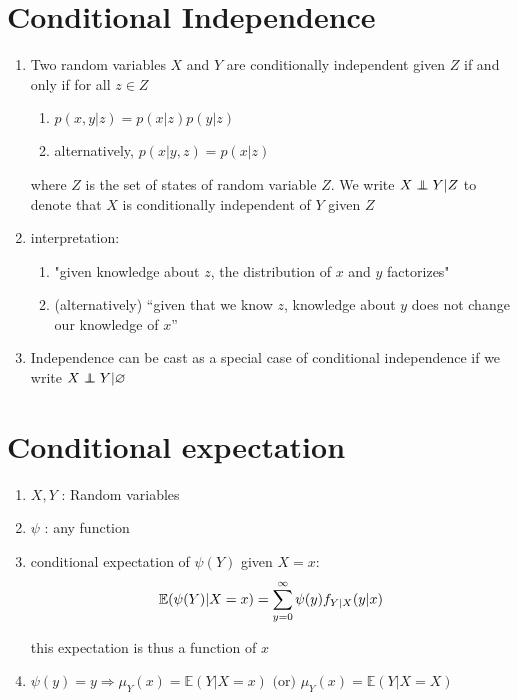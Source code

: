 \section{Conditional Independence \cite{mfml-1}} \label{Multivariate Distributions: Conditional Independence}

\begin{enumerate}
    \item Two random variables $X$ and $Y$ are conditionally independent given $Z$ if and only if for all $z \in Z$
    \begin{enumerate}
        \item $p(x, y | z) = p(x | z)p(y | z)$
        \item alternatively, $p(x | y, z) = p(x | z)$
    \end{enumerate}

    where $Z$ is the set of states of random variable $Z$. We write $X \perp\!\!\!\!\perp Y | Z$ to denote that $X$ is conditionally independent of $Y$ given $Z$

    \item interpretation:
    \begin{enumerate}
        \item "given knowledge about $z$, the distribution of $x$ and $y$ factorizes"

        \item (alternatively) “given that we know $z$, knowledge about $y$ does not change our knowledge of $x$”
    \end{enumerate}

    \item Independence can be cast as a special case of conditional independence if we write $X \perp\!\!\!\!\perp Y | \varnothing$
\end{enumerate}


\section{Conditional expectation \cite{ism-1}} \label{Multivariate Distributions: Conditional expectation}

\begin{enumerate}
    \item[] $X, Y$ : Random variables
    
    \item[] $\psi$ : any function

    \item conditional expectation of $\psi(Y)$ given $X = x$:
    \[
        \mathbb{E}(\psi(Y)|X=x)
        = \displaystyle\sum_{y=0}^{\infty}
        \psi(y)f_{Y|X}(y|x)
    \]

    this expectation is thus a function of $x$

    \item $
        \psi(y) = y
        \Rightarrow
        \mu_Y(x) = \mathbb{E}(Y|X = x)
        \text{ (or) }
        \mu_Y(x) = \mathbb{E}(Y|X = X)
    $
\end{enumerate}


